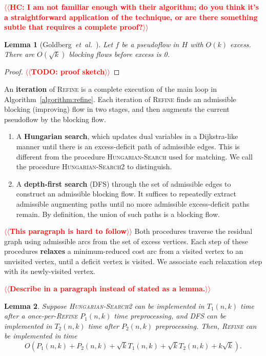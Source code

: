 \documentclass[11pt]{article}
\makeatletter
\def\etal{\textit{et~al.}}
\theoremstyle{plain}
\newtheorem{lemma}{Lemma}[section]
\numberwithin{figure}{section}
\def\EMPH#1{\textbf{\boldmath #1}}
\def\n@te#1{\textsf{\boldmath \textbf{$\langle\!\langle$#1$\rangle\!\rangle$}}\leavevmode}
\def\note#1{\textcolor{red}{\n@te{#1}}}
\makeatother
\begin{document}
\note{HC: I am not familiar enough with their algorithm; do you think it's a straightforward application of the technique, or are there something subtle that requires a complete proof?}

\begin{lemma}[Goldberg~{\etal}~{\cite[Lemma~3.11 and \S{6}]{GHKT17}}]
\label{lemma:goldberg_refine_iterations}
Let $f$ be a pseudoflow in $H$ with $O(k)$ excess.
There are $O(\sqrt{k})$ blocking flows before excess is 0.
\end{lemma}

\begin{proof}
\note{TODO: proof sketch}%
\end{proof}

An \EMPH{iteration} of \textsc{Refine} is a complete execution of the main loop
in Algorithm~\ref{algorithm:refine}.
Each iteration of \textsc{Refine} finds an admissible blocking (improving) flow
in two stages, and then augments the current pseudoflow by the blocking flow.
\begin{enumerate}
\item A \EMPH{Hungarian search}, which updates dual variables in a Dijkstra-like
	manner until there is an excess-deficit path of admissible edges.
	This is different from the procedure \textsc{Hungarian-Search} used for
	matching.
	We call the procedure \textsc{Hungarian-Search2} to distinguish.
\item A \EMPH{depth-first search} (\textsc{DFS}) through the set of admissible
	edges to construct an admissible blocking flow.
	It suffices to repeatedly extract admissible augmenting paths until
	no more admissible excess-deficit paths remain.
	By definition, the union of such paths is a blocking flow.
\end{enumerate}

\note{This paragraph is hard to follow}
Both procedures traverse the residual graph using admissible arcs from the set
of excess vertices.
Each step of these procedures \EMPH{relaxes} a minimum-reduced cost arc from a
visited vertex to an unvisited vertex, until a deficit vertex is visited.
We associate each relaxation step with its newly-visited vertex.

\note{Describe in a paragraph instead of stated as a lemma.}
\begin{lemma}
\label{lemma:goldberg_refine_time}
Suppose \textsc{Hungarian-Search2} can be implemented in $T_1(n, k)$ time after
a once-per-\textsc{Refine} $P_1(n, k)$ time preprocessing, and
\textsc{DFS} can be implemented in $T_2(n, k)$ time after $P_2(n, k)$ preprocessing.
Then, \textsc{Refine} can be implemented in time
\[
O(P_1(n, k) + P_2(n, k) + \sqrt{k}T_1(n, k) + \sqrt{k}T_2(n, k) + k\sqrt{k}).
\]
\end{lemma}
\end{document}

